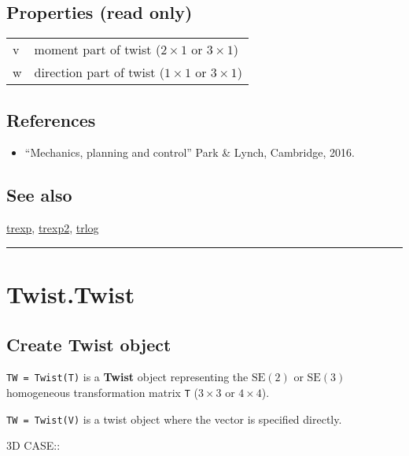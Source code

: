 \subsection*{Properties (read only)}
\begin{longtable}{lp{120mm}}
v & moment part of twist ($2 \times 1$ or $3 \times 1$)\\ 
w & direction part of twist ($1 \times 1$ or $3 \times 1$)\\ 
\end{longtable}\vspace{1ex}

\subsection*{References}
\begin{itemize}
  \item ``Mechanics, planning and control''    Park \& Lynch, Cambridge, 2016.
\end{itemize}

\subsection*{See also}


\hyperlink{trexp}{\color{blue} trexp}, \hyperlink{trexp2}{\color{blue} trexp2}, \hyperlink{trlog}{\color{blue} trlog}

\vspace{1.5ex}\hrule

\hypertarget{Twist.Twist}{\section*{Twist.Twist}}
\subsection*{Create Twist object}


\texttt{TW = Twist(T)} is a \textbf{\color{red} Twist} object representing the $\mbox{SE}(2)$ or $\mbox{SE}(3)$
homogeneous transformation matrix \texttt{T} ($3 \times 3$ or $4 \times 4$).



\texttt{TW = Twist(V)} is a twist object where the vector is specified directly.



3D CASE::



